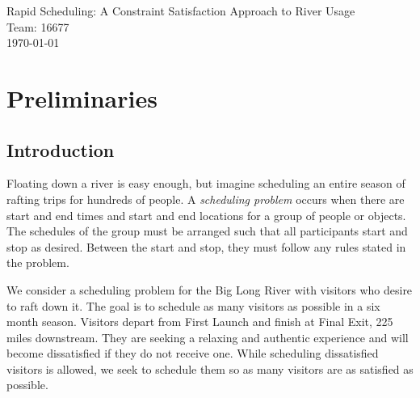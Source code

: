 \documentclass[11pt]{article} %
\begin{document}
\begin{titlepage}
    \vspace*{\fill}
    \begin{center}
      \Huge{Rapid Scheduling: A Constraint Satisfaction
        Approach to River Usage}\\[0.5cm]
      \Large{Team: 16677}\\[0.4cm]
      \today
    \end{center}
    \vspace*{\fill}
  \end{titlepage}
\newpage
\vspace*{\fill}
\tableofcontents
\vspace*{\fill}
\newpage

\section{Preliminaries}
\label{sec:prelims}

\subsection{Introduction}
\label{sec:intro}
Floating down a river is easy enough, but imagine scheduling an entire
season of rafting trips for hundreds of people.  A \textit{scheduling problem}
occurs when there are start and end times and start and end locations for a group of people
or objects. The schedules of the group must be arranged such that all
participants start and stop as desired. Between the start and stop, they
must follow any rules stated in the problem.

We consider a scheduling problem for the Big Long River with visitors who desire to
raft down it. The goal is to schedule as many visitors as possible in a six
month season.  Visitors depart from First Launch and finish at Final Exit,
225 miles downstream. They are seeking a relaxing and authentic experience and
will become dissatisfied if they do not receive one. While scheduling
dissatisfied visitors is allowed, we seek to schedule them so as many
visitors are as satisfied as possible.
\end{document}
